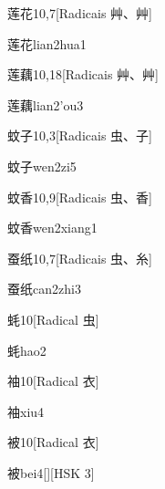 \begin{entry}{莲花}{10,7}[Radicais ⾋、⾋]
  \begin{phonetics}{莲花}{lian2hua1}
  \end{phonetics}
\end{entry}

\begin{entry}{莲藕}{10,18}[Radicais ⾋、⾋]
  \begin{phonetics}{莲藕}{lian2'ou3}
  \end{phonetics}
\end{entry}

\begin{entry}{蚊子}{10,3}[Radicais ⾍、⼦]
  \begin{phonetics}{蚊子}{wen2zi5}
  \end{phonetics}
\end{entry}

\begin{entry}{蚊香}{10,9}[Radicais ⾍、⾹]
  \begin{phonetics}{蚊香}{wen2xiang1}
  \end{phonetics}
\end{entry}

\begin{entry}{蚕纸}{10,7}[Radicais ⾍、⽷]
  \begin{phonetics}{蚕纸}{can2zhi3}
  \end{phonetics}
\end{entry}

\begin{entry}{蚝}{10}[Radical ⾍]
  \begin{phonetics}{蚝}{hao2}
  \end{phonetics}
\end{entry}

\begin{entry}{袖}{10}[Radical ⾐]
  \begin{phonetics}{袖}{xiu4}
  \end{phonetics}
\end{entry}

\begin{entry}{被}{10}[Radical ⾐]
  \begin{phonetics}{被}{bei4}[][HSK 3]
  \end{phonetics}
\end{entry}


